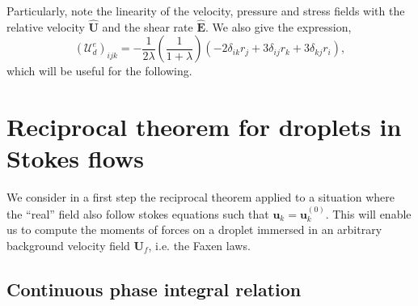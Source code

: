 Particularly, note the linearity of the velocity, pressure and stress fields with the relative velocity $\hat{\textbf{U}}$ and the shear rate $\hat{\textbf{E}}$. 
We also give the expression, 
\begin{equation*}
    (\mathcal{U}_d^e)_{ijk} 
    = 
    - \frac{1}{2\lambda}\left(\frac{1}{1+\lambda}\right)(-2 \delta_{ik} r_j + 3\delta_{ij} r_k + 3\delta_{kj} r_i) ,
\end{equation*}
which will be useful for the following. 


\section{Reciprocal theorem for droplets in Stokes flows}

We consider in a first step the reciprocal theorem applied to a situation where the ``real'' field also follow stokes equations such that $\textbf{u}_k =\textbf{u}_k^{(0)}$. 
This will enable us to compute the moments of forces on a droplet immersed in an arbitrary background velocity field $\textbf{U}_f$, i.e. the Faxen laws. 


\subsection{Continuous phase integral relation}

